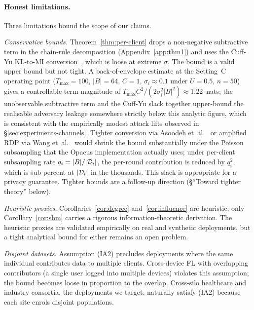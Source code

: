 \paragraph{Honest limitations.}
Three limitations bound the scope of our claims.

\textit{Conservative bounds.}
Theorem~\ref{thm:per-client} drops a non-negative subtractive term in
the chain-rule decomposition (Appendix~\ref{app:thm1}) and uses the
Cuff-Yu KL-to-MI conversion~\cite{cuff2016mi}, which is loose at
extreme $\sigma$. The bound is a valid upper bound but not tight.
A back-of-envelope estimate at the Setting~C operating point
($T_{\max}=100$, $|B|=64$, $C=1$, $\sigma_i \approx 0.1$ under
$U=0.5$, $n=50$) gives a controllable-term magnitude of
$T_{\max} C^2/(2\sigma_i^2 |B|^2) \approx 1.22$~nats; the
unobservable subtractive term and the Cuff-Yu slack together upper-bound
the realisable adversary leakage somewhere strictly below this
analytic figure, which is consistent with the empirically modest
attack lifts observed in \S\ref{sec:experiments-channels}. Tighter
conversion via Asoodeh et~al.~\cite{asoodeh2021variants} or amplified
RDP via Wang et~al.~\cite{wang2019subsampled} would shrink the bound
substantially under the Poisson subsampling that the Opacus
implementation actually uses; under per-client subsampling rate
$q_i = |B|/|\mathcal{D}_i|$, the per-round contribution is reduced by
$q_i^2$, which is sub-percent at $|\mathcal{D}_i|$ in the thousands. This
slack is appropriate for a privacy guarantee. Tighter bounds are a
follow-up direction (\S``Toward tighter theory'' below).

\textit{Heuristic proxies.}
Corollaries~\ref{cor:degree} and~\ref{cor:influence} are heuristic;
only Corollary~\ref{cor:sbm} carries a rigorous information-theoretic
derivation. The heuristic proxies are validated empirically on real
and synthetic deployments, but a tight analytical bound for either
remains an open problem.

\textit{Disjoint datasets.}
Assumption (IA2) precludes deployments where the same individual
contributes data to multiple clients. Cross-device FL with overlapping
contributors (\eg a single user logged into multiple devices) violates
this assumption; the bound becomes loose in proportion to the overlap.
Cross-silo healthcare and industry consortia, the deployments we
target, naturally satisfy (IA2) because each site enrols disjoint
populations.

